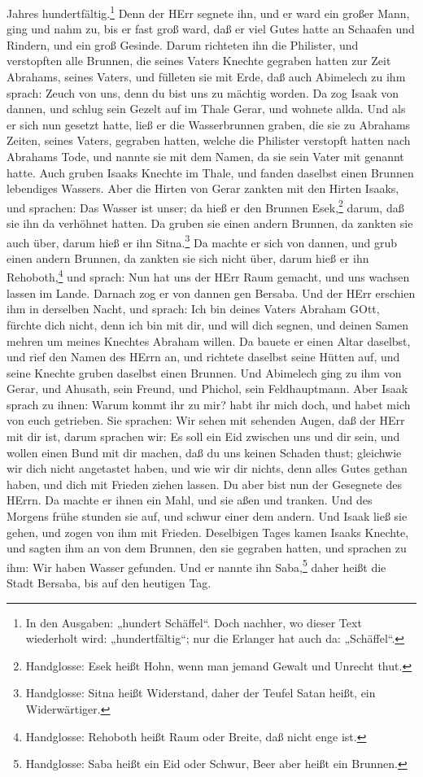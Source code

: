 \begin{schriftzitat}
Jahres hundertfältig.\footnote{In den Ausgaben: „hundert Schäffel“. Doch nachher, wo dieser Text wiederholt wird: „hundertfältig“; nur die Erlanger hat auch da: „Schäffel“.} Denn der HErr segnete ihn, und er ward ein großer Mann, ging und nahm zu, bis er fast groß ward, daß er viel Gutes hatte an Schaafen und Rindern, und ein groß Gesinde. Darum richteten ihn die Philister, und verstopften alle Brunnen, die seines Vaters Knechte gegraben hatten zur Zeit Abrahams, seines Vaters, und fülleten sie mit Erde, daß auch Abimelech zu ihm sprach: Zeuch von uns, denn du bist uns zu mächtig worden. Da zog Isaak von dannen, und schlug sein Gezelt auf im Thale Gerar, und wohnete allda. Und als er sich nun gesetzt hatte, ließ er die Wasserbrunnen graben, die sie zu Abrahams Zeiten, seines Vaters, gegraben hatten, welche die Philister verstopft hatten nach Abrahams Tode, und nannte sie mit dem Namen, da sie sein Vater mit genannt hatte. Auch gruben Isaaks Knechte im Thale, und fanden daselbst einen Brunnen lebendiges Wassers. Aber die Hirten von Gerar zankten mit den Hirten Isaaks, und sprachen: Das Wasser ist unser; da hieß er den Brunnen Esek,\footnote{Handglosse: Esek heißt Hohn, wenn man jemand Gewalt und Unrecht thut.} darum, daß sie ihn da verhöhnet hatten. Da gruben sie einen andern Brunnen, da zankten sie auch über, darum hieß er ihn Sitna.\footnote{Handglosse: Sitna heißt Widerstand, daher der Teufel Satan heißt, ein Widerwärtiger.} Da machte er sich von dannen, und grub einen andern Brunnen, da zankten sie sich nicht über, darum hieß er ihn Rehoboth,\footnote{Handglosse: Rehoboth heißt Raum oder Breite, daß nicht enge ist.} und sprach: Nun hat uns der HErr Raum gemacht, und uns wachsen lassen im Lande. Darnach zog er von dannen gen Bersaba. Und der HErr erschien ihm in derselben Nacht, und sprach: Ich bin deines Vaters Abraham GOtt, fürchte dich nicht, denn ich bin mit dir, und will dich segnen, und deinen Samen mehren um meines Knechtes Abraham willen. Da bauete er einen Altar daselbst, und rief den Namen des HErrn an, und richtete daselbst seine Hütten auf, und seine Knechte gruben daselbst einen Brunnen. Und Abimelech ging zu ihm von Gerar, und Ahusath, sein Freund, und Phichol, sein Feldhauptmann. Aber Isaak sprach zu ihnen: Warum kommt ihr zu mir? habt ihr mich doch, und habet mich von euch getrieben. Sie sprachen: Wir sehen mit sehenden Augen, daß der HErr mit dir ist, darum sprachen wir: Es soll ein Eid zwischen uns und dir sein, und wollen einen Bund mit dir machen, daß du uns keinen Schaden thust; gleichwie wir dich nicht angetastet haben, und wie wir dir nichts, denn alles Gutes gethan haben, und dich mit Frieden ziehen lassen. Du aber bist nun der Gesegnete des HErrn. Da machte er ihnen ein Mahl, und sie aßen und tranken. Und des Morgens frühe stunden sie auf, und schwur einer dem andern. Und Isaak ließ sie gehen, und zogen von ihm mit Frieden. Deselbigen Tages kamen Isaaks Knechte, und sagten ihm an von dem Brunnen, den sie gegraben hatten, und sprachen zu ihm: Wir haben Wasser gefunden. Und er nannte ihn Saba,\footnote{Handglosse: Saba heißt ein Eid oder Schwur, Beer aber heißt ein Brunnen.} daher heißt die Stadt Bersaba, bis auf den heutigen Tag.
\end{schriftzitat}

